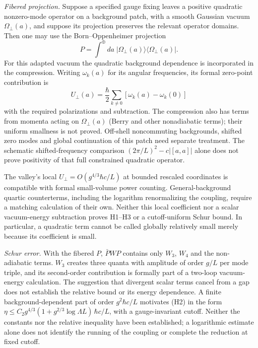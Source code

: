 \documentclass[11pt,a4paper]{article}
\begin{document}
\emph{Fibered projection.} Suppose a specified gauge fixing leaves a
positive quadratic nonzero-mode operator on a background patch, with a
smooth Gaussian vacuum \(\Omega_\perp(a)\), and suppose its projection
preserves the relevant operator domains. Then one may use the
Born--Oppenheimer projection \[P=\int^\oplus da\;|\Omega_\perp(a)\rangle
\langle\Omega_\perp(a)|.\] For this adapted vacuum the quadratic
background dependence is incorporated in the compression. Writing
\(\omega_k(a)\) for its angular frequencies, its formal zero-point
contribution is \[U_\perp(a)=\frac{\hbar}{2}\sum_{k\ne0}
[\omega_k(a)-\omega_k(0)]\] with the required polarizations and
subtraction. The compression also has terms from momenta acting on
\(\Omega_\perp(a)\) (Berry and other nonadiabatic terms); their uniform
smallness is not proved. Off-shell noncommuting backgrounds, shifted
zero modes and global continuation of this patch need separate
treatment. The schematic shifted-frequency comparison
\((2\pi/L)^2-c|[a,a]|\) alone does not prove positivity of that full
constrained quadratic operator.

The valley's local \(U_\perp=O(g^{4/3}\hbar c/L)\) at bounded rescaled
coordinates is compatible with formal small-volume power counting.
General-background quartic counterterms, including the logarithm
renormalizing the coupling, require a matching calculation of their own.
Neither this local coefficient nor a scalar vacuum-energy subtraction
proves H1--H3 or a cutoff-uniform Schur bound. In particular, a
quadratic term cannot be called globally relatively small merely because
its coefficient is small.

\emph{Schur error.} With the fibered \(P\), \(\bar PWP\) contains only
\(W_3\), \(W_4\) and the non-adiabatic terms. \(W_3\) creates three
quanta with amplitude of order \(g/L\) per mode triple, and its
second-order contribution is formally part of a two-loop vacuum-energy
calculation. The suggestion that divergent scalar terms cancel from a
gap does not establish the relative bound or its energy dependence. A
finite background-dependent part of order \(g^2\hbar c/L\) motivates
(H2) in the form
\(\eta\le C_2g^{4/3}(1+g^{2/3}\log\Lambda L)\,\hbar c/L\), with a
gauge-invariant cutoff. Neither the constants nor the relative
inequality have been established; a logarithmic estimate alone does not
identify the running of the coupling or complete the reduction at fixed
cutoff.
\end{document}
